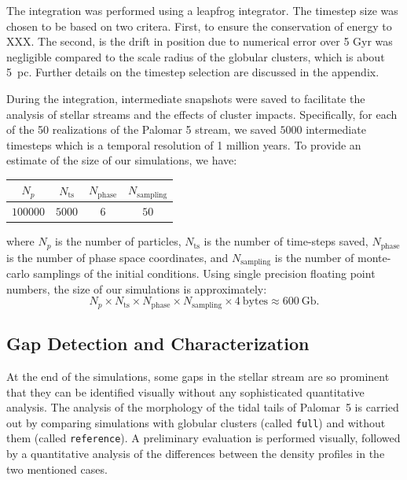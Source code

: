 \documentclass[draft]{aa}
\begin{document}
    The integration was performed using a leapfrog integrator. The timestep size was chosen to be based on two critera. First, to ensure the conservation of energy to XXX. The second, is the drift in position due to numerical error over 5 Gyr was negligible compared to the scale radius of the globular clusters, which is about 5~pc. Further details on the timestep selection are discussed in the appendix.

    During the integration, intermediate snapshots were saved to facilitate the analysis of stellar streams and the effects of cluster impacts. Specifically, for each of the 50 realizations of the Palomar 5 stream, we saved $5000$ intermediate timesteps which is a temporal resolution of 1 million years. To provide an estimate of the size of our simulations, we have:
    \begin{tabular}{c|c|c|c}
      $N_p$ & $N_{\textrm{ts}}$ & $N_{\textrm{phase}}$ & $N_{\textrm{sampling}}$  \\
      \hline
      $100000$ & $5000$ & $6$ & $50$   \\
    \end{tabular} 
    where $N_p$  is the number of particles, $N_{\textrm{ts}}$ is the number of time-steps saved, $N_{\textrm{phase}}$ is the number of phase space coordinates, and $N_{\textrm{sampling}}$ is the number of monte-carlo samplings of the initial conditions. Using single precision floating point numbers, the size of our simulations is approximately:
    \begin{equation} \label{eq:data_volume_estimate}
      N_p \times N_{\textrm{ts}}\times N_{\textrm{phase}}\times N_{\textrm{sampling}} \times 4~\textrm{bytes}\approx 600~\textrm{Gb}.
    \end{equation}




  \subsection{Gap Detection and Characterization} \label{sec:gap_methods}

    At the end of the simulations, some gaps in the stellar stream are so prominent that they can be identified visually without any sophisticated quantitative analysis. The analysis of the morphology of the tidal tails of Palomar~5 is carried out by comparing simulations with globular clusters (called \texttt{full}) and without them (called \texttt{reference}). A preliminary evaluation is performed visually, followed by a quantitative analysis of the differences between the density profiles in the two mentioned cases. 
\end{document}
